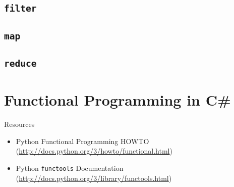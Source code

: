 \documentclass[ignorenonframetext,red]{beamer}
\begin{document}
\subsection{\tt filter}

\subsection{\tt map}

\subsection{\tt reduce}

\section{Functional Programming in C\#}
\begin{frame}
\end{frame}

\begin{frame}{Resources}
\begin{itemize}
	\item Python Functional Programming HOWTO\\(\url{http://docs.python.org/3/howto/functional.html})
	\item Python {\tt functools} Documentation\\(\url{http://docs.python.org/3/library/functools.html})
\end{itemize}
\end{frame}
\end{document}

